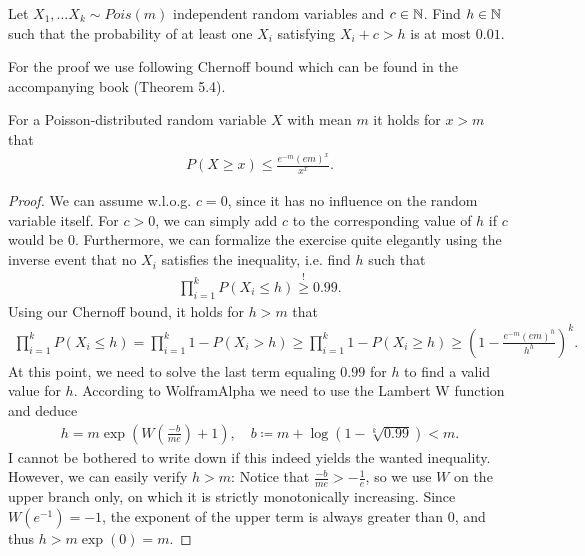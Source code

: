 \begin{aufgabe}
    Let $X_1, \dots X_k \sim Pois(m)$ independent random variables and $c \in \mathbb{N}$.
    Find $h \in \mathbb{N}$ such that the probability of at least one $X_i$ satisfying $X_i + c > h$ is at most $0.01$.

    For the proof we use following Chernoff bound which can be found in the accompanying book (Theorem 5.4).
    \begin{fact}
        For a Poisson-distributed random variable $X$ with mean $m$ it holds for $x > m$ that
        \begin{align*}
            P(X \geq x) \leq \frac{e^{-m}(em)^x}{x^x}.
        \end{align*}
    \end{fact}
    \begin{proof}
        We can assume w.l.o.g. $c=0$, since it has no influence on the random variable itself.
        For $c > 0$, we can simply add $c$ to the corresponding value of $h$ if $c$ would be $0$.
        Furthermore, we can formalize the exercise quite elegantly using the inverse event that no $X_i$ satisfies the inequality, i.e. find $h$ such that
        \begin{align*}
            \prod_{i=1}^{k}P(X_i \leq h) \overset{!}{\geq} 0.99.
        \end{align*}
        Using our Chernoff bound, it holds for $h > m$ that
        \begin{align*}
            \prod_{i=1}^{k}P(X_i \leq h) = \prod_{i=1}^{k}1 - P(X_i > h) \geq \prod_{i=1}^{k}1 - P(X_i \geq h) \geq\left(1- \frac{e^{-m}(em)^{h}}{h^{h}}\right)^k.
        \end{align*}
        At this point, we need to solve the last term equaling $0.99$ for $h$ to find a valid value for $h$.
        According to WolframAlpha we need to use the Lambert W function and deduce
        \begin{align*}
            h = m\exp\left(W\left(\frac{-b}{me}\right)+1  \right), \quad b \coloneqq m + \log(1-\sqrt[k]{0.99}) < m.
        \end{align*}
        I cannot be bothered to write down if this indeed yields the wanted inequality.
        However, we can easily verify $h > m$:
        Notice that $\frac{-b}{me} > - \frac{1}{e}$, so we use $W$ on the upper branch only, on which it is strictly monotonically increasing.
        Since $W(e^{-1})=-1$, the exponent of the upper term is always greater than $0$, and thus $h > m \exp(0) = m$.
    \end{proof}
\end{aufgabe}
